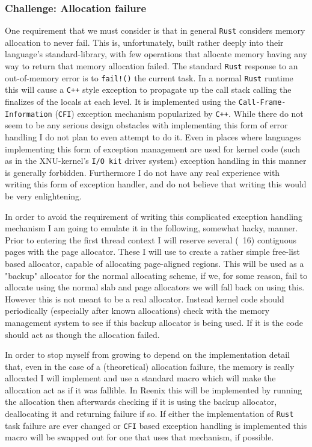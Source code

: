 \documentclass[12pt,letterpaper]{article}
\newcommand{\rust}{\texttt{Rust}}
\begin{document}
\subsubsection{Challenge: Allocation failure}
One requirement that we must consider is that in general \rust{}
considers memory allocation to never fail. This is, unfortunately,
built rather deeply into their language's standard-library, with few
operations that allocate memory having any way to return that memory
allocation failed.  The standard \rust{} response to an out-of-memory
error is to \texttt{fail!()} the current task.  In a normal \rust{}
runtime this will cause a \texttt{C++} style exception to propagate up
the call stack calling the finalizes of the locals at each level. It
is implemented using the \texttt{Call-Frame-Information} (\texttt{CFI})
exception mechanism popularized by \texttt{C++}. While there do not seem
to be any serious design obstacles with implementing this form of error
handling I do not plan to even attempt to do it. Even in places where
languages implementing this form of exception management are used for
kernel code (such as in the XNU-kernel's \texttt{I/O kit} driver system)
exception handling in this manner is generally forbidden. Furthermore
I do not have any real experience with writing this form of exception
handler, and do not believe that writing this would be very enlightening.

In order to avoid the requirement of writing this complicated exception
handling mechanism I am going to emulate it in the following, somewhat
hacky, manner. Prior to entering the first thread context I will reserve
several (~16) contiguous pages with the page allocator.  These I will use
to create a rather simple free-list based allocator, capable of allocating
page-aligned regions. This will be used as a "backup" allocator for
the normal allocating scheme, if we, for some reason, fail to allocate
using the normal slab and page allocators we will fall back on using
this. However this is not meant to be a real allocator. Instead kernel
code should periodically (especially after known allocations) check with
the memory management system to see if this backup allocator is being
used. If it is the code should act as though the allocation failed.

In order to stop myself from growing to depend on the implementation
detail that, even in the case of a (theoretical) allocation failure,
the memory is really allocated I will implement and use a standard macro
which will make the allocation act as if it was fallible. In Reenix this
will be implemented by running the allocation then afterwards checking if
it is using the backup allocator, deallocating it and returning failure
if so. If either the implementation of \rust{} task failure are ever
changed or \texttt{CFI} based exception handling is implemented this
macro will be swapped out for one that uses that mechanism, if possible.
\end{document}

